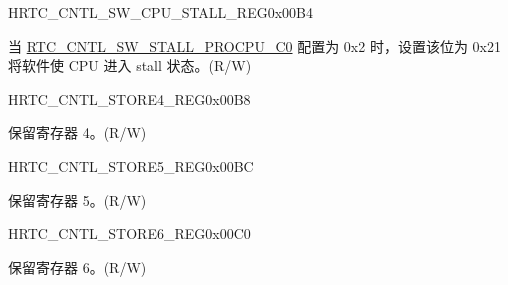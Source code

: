 \begin{register}{H}{RTC\_CNTL\_SW\_CPU\_STALL\_REG}{0x00B4}\label{regdesc:RTCCNTLSWCPUSTALLREG}
%
%
%
\regnewline%
\begin{regdesc}\begin{reglist}
\label{fielddesc:RTCCNTLSWSTALLPROCPUC1}\item [RTC\_CNTL\_SW\_STALL\_PROCPU\_C1] 当 \hyperref[fielddesc:RTCCNTLSWSTALLPROCPUC0]{RTC\_CNTL\_SW\_STALL\_PROCPU\_C0} 配置为 0x2 时，设置该位为 0x21 将软件使 CPU 进入 stall 状态。(R/W)
\end{reglist}\end{regdesc}
\end{register}

\begin{register}{H}{RTC\_CNTL\_STORE4\_REG}{0x00B8}\label{regdesc:RTCCNTLSTORE4REG}
%
\regnewline%
\begin{regdesc}\begin{reglist}
\label{fielddesc:RTCCNTLSCRATCH4}\item [RTC\_CNTL\_SCRATCH4] 保留寄存器 4。(R/W)
\end{reglist}\end{regdesc}
\end{register}


\begin{register}{H}{RTC\_CNTL\_STORE5\_REG}{0x00BC}\label{regdesc:RTCCNTLSTORE5REG}
%
\regnewline%
\begin{regdesc}\begin{reglist}
\label{fielddesc:RTCCNTLSCRATCH5}\item [RTC\_CNTL\_SCRATCH5] 保留寄存器 5。(R/W)
\end{reglist}\end{regdesc}
\end{register}


\begin{register}{H}{RTC\_CNTL\_STORE6\_REG}{0x00C0}\label{regdesc:RTCCNTLSTORE6REG}
%
\regnewline%
\begin{regdesc}\begin{reglist}
\label{fielddesc:RTCCNTLSCRATCH6}\item [RTC\_CNTL\_SCRATCH6] 保留寄存器 6。(R/W)
\end{reglist}\end{regdesc}
\end{register}


